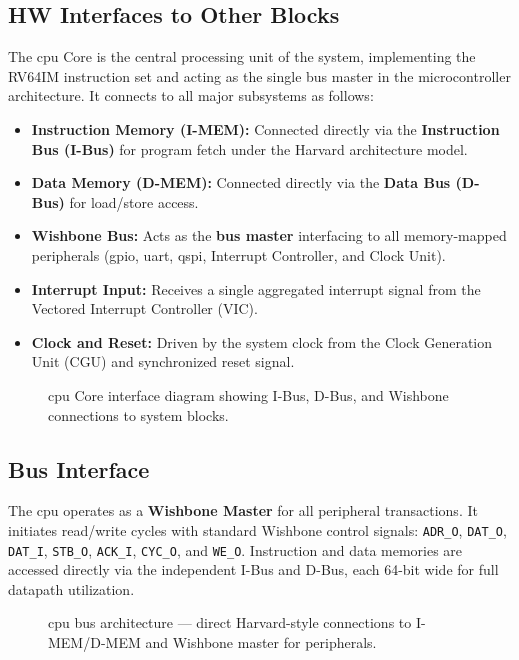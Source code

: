 \subsection{HW Interfaces to Other Blocks}
The \gls{cpu} Core is the central processing unit of the system, implementing
the RV64IM instruction set and acting as the single bus master in the
microcontroller architecture. It connects to all major subsystems as follows:
\begin{itemize}
    \item \textbf{Instruction Memory (\gls{I-MEM}):} Connected directly via the \textbf{Instruction Bus (I-Bus)}
          for program fetch under the \gls{Harvard} architecture model.
    \item \textbf{Data Memory (\gls{D-MEM}):} Connected directly via the \textbf{Data Bus (D-Bus)} for load/store access.
    \item \textbf{Wishbone Bus:} Acts as the \textbf{bus master} interfacing to all memory-mapped peripherals
          (\gls{gpio}, \gls{uart}, \gls{qspi}, Interrupt Controller, and Clock Unit).
    \item \textbf{Interrupt Input:} Receives a single aggregated interrupt signal from the Vectored Interrupt Controller (VIC).
    \item \textbf{Clock and Reset:} Driven by the system clock from the Clock Generation Unit (CGU) and
          synchronized reset signal.
\end{itemize}

\begin{figure}[H]
    \centering
    \caption{\gls{cpu} Core interface diagram showing I-Bus, D-Bus, and Wishbone connections to system blocks.}
    \label{fig:cpu_interface}
\end{figure}

\subsection{Bus Interface}
The \gls{cpu} operates as a \textbf{Wishbone Master} for all peripheral
transactions. It initiates read/write cycles with standard Wishbone control
signals: \texttt{ADR\_O}, \texttt{DAT\_O}, \texttt{DAT\_I}, \texttt{STB\_O},
\texttt{ACK\_I}, \texttt{CYC\_O}, and \texttt{WE\_O}. Instruction and data
memories are accessed directly via the independent I-Bus and D-Bus, each 64-bit
wide for full datapath utilization.

\begin{figure}[H]
    \centering
    \caption{\gls{cpu} bus architecture — direct \gls{Harvard}-style connections to \gls{I-MEM}/\gls{D-MEM} and Wishbone master for peripherals.}
    \label{fig:cpu_bus_arch}
\end{figure}

